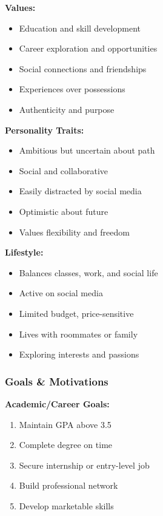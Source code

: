 \textbf{Values:}
\begin{itemize}
    \item Education and skill development
    \item Career exploration and opportunities
    \item Social connections and friendships
    \item Experiences over possessions
    \item Authenticity and purpose
\end{itemize}

\textbf{Personality Traits:}
\begin{itemize}
    \item Ambitious but uncertain about path
    \item Social and collaborative
    \item Easily distracted by social media
    \item Optimistic about future
    \item Values flexibility and freedom
\end{itemize}

\textbf{Lifestyle:}
\begin{itemize}
    \item Balances classes, work, and social life
    \item Active on social media
    \item Limited budget, price-sensitive
    \item Lives with roommates or family
    \item Exploring interests and passions
\end{itemize}

\subsubsection{Goals \& Motivations}

\textbf{Academic/Career Goals:}
\begin{enumerate}
    \item Maintain GPA above 3.5
    \item Complete degree on time
    \item Secure internship or entry-level job
    \item Build professional network
    \item Develop marketable skills
\end{enumerate}

\text